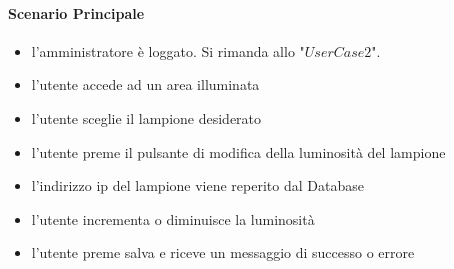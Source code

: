 \documentclass[12pt]{article}
\begin{document}
\paragraph{Scenario Principale}
\begin{itemize}
	\item l'amministratore è loggato. Si rimanda allo "$User Case 2$".
	\item l'utente accede ad un area illuminata
	\item l'utente sceglie il lampione desiderato
	\item l'utente preme il pulsante di modifica della luminosità del lampione
	\item l'indirizzo ip del lampione viene reperito dal Database
	\item l'utente incrementa o diminuisce la luminosità
	\item l'utente preme salva e riceve un messaggio di successo o errore
\end{itemize}
\end{document}
